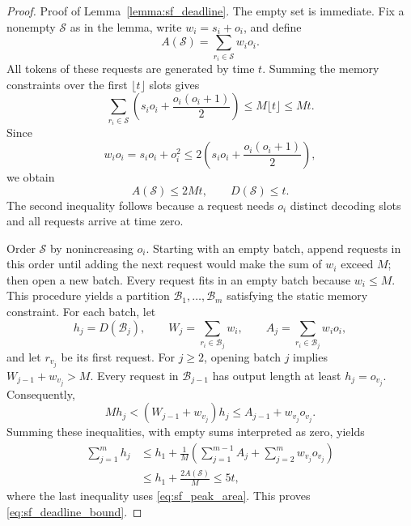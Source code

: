 \documentclass[nonblindrev]{informs3_hide}
\begin{document}
\begin{proof}{Proof of Lemma~\ref{lemma:sf_deadline}.}
The empty set is immediate. Fix a nonempty $\mathcal S$ as in the lemma,
write $w_i=s_i+o_i$, and define
\[
    A(\mathcal S)=\sum_{r_i\in\mathcal S}w_io_i.
\]
All tokens of these requests are generated by time $t$. Summing the memory
constraints over the first $\lfloor t\rfloor$ slots gives
\begin{equation}
\label{eq:sf_memory_time}
    \sum_{r_i\in\mathcal S}
    \left(s_io_i+\frac{o_i(o_i+1)}2\right)
    \le M\lfloor t\rfloor\le Mt.
\end{equation}
Since
\[
    w_io_i=s_io_i+o_i^2
    \le2\left(s_io_i+\frac{o_i(o_i+1)}2\right),
\]
we obtain
\begin{equation}
\label{eq:sf_peak_area}
    A(\mathcal S)\le2Mt,
    \qquad D(\mathcal S)\le t.
\end{equation}
The second inequality follows because a request needs $o_i$ distinct
decoding slots and all requests arrive at time zero.

Order $\mathcal S$ by nonincreasing $o_i$. Starting with an empty batch,
append requests in this order until adding the next request would make the
sum of $w_i$ exceed $M$; then open a new batch. Every request fits in an
empty batch because $w_i\le M$. This procedure yields a partition
$\mathcal B_1,\ldots,\mathcal B_m$ satisfying the static memory constraint.
For each batch, let
\[
    h_j=D(\mathcal B_j),\qquad
    W_j=\sum_{r_i\in\mathcal B_j}w_i,\qquad
    A_j=\sum_{r_i\in\mathcal B_j}w_io_i,
\]
and let $r_{v_j}$ be its first request. For $j\ge2$, opening batch $j$
implies $W_{j-1}+w_{v_j}>M$. Every request in $\mathcal B_{j-1}$ has output
length at least $h_j=o_{v_j}$. Consequently,
\[
    Mh_j<(W_{j-1}+w_{v_j})h_j
    \le A_{j-1}+w_{v_j}o_{v_j}.
\]
Summing these inequalities, with empty sums interpreted as zero, yields
\[
\begin{aligned}
    \sum_{j=1}^m h_j
    &\le h_1+\frac1M
       \left(\sum_{j=1}^{m-1}A_j
             +\sum_{j=2}^m w_{v_j}o_{v_j}\right)\\
    &\le h_1+\frac{2A(\mathcal S)}M
    \le5t,
\end{aligned}
\]
where the last inequality uses \eqref{eq:sf_peak_area}. This proves
\eqref{eq:sf_deadline_bound}.
\Halmos
\end{proof}
\end{document}
